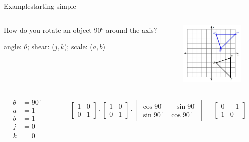 \documentclass{beamer}
\begin{document}
\begin{frame}{Example}{starting simple}
  \begin{columns}
    \begin{column}{0.6\textwidth}
      {\Large How do you rotate an object 90° around the axis?} \pause

      \vspace{10mm}

      angle: $\theta$; shear: ($j, k$); scale: ($a, b$)
    \end{column}

    \begin{column}{0.4\textwidth}
      \includegraphics[height=30mm]{example_rotation}
    \end{column}

  \end{columns}
  

  \vspace{0.5cm}

  \begin{columns}
    \begin{column}{0.3\textwidth}
      \begin{align*}
        \theta &= 90^{\circ} \\
        a &= 1 \\
        b &= 1 \\
        j &= 0 \\
        k &= 0
      \end{align*} \pause
    \end{column}
    \begin{column}{0.7\textwidth}
      \begin{align*}
        \begin{bmatrix}
          1 & 0 \\
          0 & 1
        \end{bmatrix}
        \cdot
        \begin{bmatrix}
          1 & 0 \\
          0 & 1
        \end{bmatrix}
        \cdot
        \begin{bmatrix}
          \cos{90^{\circ}} & -\sin{90^{\circ}} \\
          \sin{90^{\circ}} & \cos{90^{\circ}}
        \end{bmatrix}
        =
        \begin{bmatrix}
          0 & -1 \\
          1 & 0
        \end{bmatrix}
      \end{align*}
    \end{column}
  \end{columns}
\end{frame}
\end{document}
